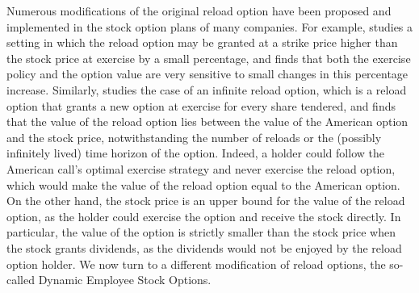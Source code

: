     Numerous modifications of the original reload option have been proposed and implemented in the stock option plans of many companies. For example, \cite{belanger2008infinite} studies a setting in which the reload option may be granted at a strike price higher than the stock price at exercise by a small percentage, and finds that both the exercise policy and the option value are very sensitive to small changes in this percentage increase. Similarly, \cite{dybvig2003employee} studies the case of an infinite reload option, which is a reload option that grants a new option at exercise for every share tendered, and finds that the value of the reload option lies between the value of the American option and the stock price, notwithstanding the number of reloads or the (possibly infinitely lived) time horizon of the option. Indeed, a holder could follow the American call's optimal exercise strategy and never exercise the reload option, which would make the value of the reload option equal to the American option. On the other hand, the stock price is an upper bound for the value of the reload option, as the holder could exercise the option and receive the stock directly. In particular, the value of the option is strictly smaller than the stock price when the stock grants dividends, as the dividends would not be enjoyed by the reload option holder. We now turn to a different modification of reload options, the so-called Dynamic Employee Stock Options.

